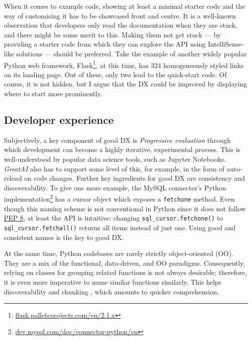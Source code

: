 When it comes to example code, showing at least a minimal starter code and the way of customising it has to be showcased front and centre. It is a well-known observation that developers only read the documentation when they are stuck, and there might be some merit to this. Making them not get stuck --- by providing a starter code from which they can explore the API using IntelliSense-like solutions --- should be preferred. Take the example of another widely popular Python web framework, Flask\footnote{\href{https://flask.palletsprojects.com/en/2.1.x/}{flask.palletsprojects.com/en/2.1.x}}, at this time, has 324 homogeneously styled links on its landing page. Out of these, only two lead to the quick-start code. Of course, it is not hidden, but I argue that the DX could be improved by displaying where to start more prominently.

\subsection{Developer experience}

Subjectively, a key component of good DX is \textit{Progressive evaluation} through which development can become a highly iterative, experimental process. This is well-understood by popular data science tools, such as Jupyter Notebooks. \textit{GreatAI} also has to support some level of this, for example, in the form of auto-reload on code changes. Further key ingredients for good DX are consistency and discoverability. To give one more example, the MySQL connector's Python implementation\footnote{\href{https://dev.mysql.com/doc/connector-python/en/}{dev.mysql.com/doc/connector-python/en}} has a cursor object which exposes a \texttt{fetchone} method. Even though this naming scheme is not conventional in Python since it does not follow \href{https://peps.python.org/pep-0008/}{PEP 8}, at least the API is intuitive: changing \texttt{sql\_cursor.fetchone()} to \texttt{sql\_cursor.fetchall()} returns all items instead of just one. Using good and consistent names is the key to good DX.

At the same time, Python codebases are rarely strictly object-oriented (OO). They are a mix of the functional, data-driven, and OO paradigms. Consequently, relying on classes for grouping related functions is not always desirable; therefore, it is even more imperative to name similar functions similarly. This helps discoverability and chunking \cite{hermans2021programmer}, which amounts to quicker comprehension.

